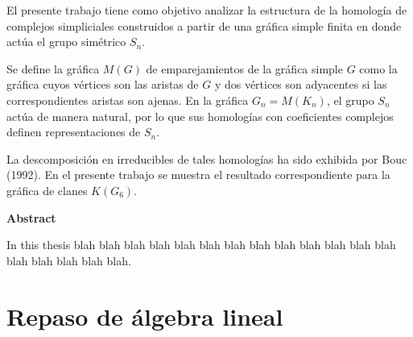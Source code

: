 \documentclass[12pt]{book}
\theoremstyle{definition}
\newcounter{in}
\newcounter{ini}
\begin{document}
El presente trabajo tiene como objetivo analizar la estructura de
la homología de complejos simpliciales construidos a partir de una
gráfica simple finita en donde actúa el grupo simétrico $S_{n}$.

Se define la gráfica $M(G)$ de emparejamientos de la gráfica simple
$G$ como la gráfica cuyos vértices son las aristas de $G$ y dos
vértices son adyacentes si las correspondientes aristas son ajenas. En
la gráfica $G_{n}=M(K_{n})$, el grupo $S_{n}$ actúa de manera natural, por
lo que sus homologías con coeficientes complejos definen
representaciones de $S_{n}$. 

La descomposición en irreducibles de tales homologías ha sido exhibida
por Bouc (1992). En el presente trabajo se muestra el resultado
correspondiente para la gráfica de clanes $K(G_{6})$.

\vspace{2cm}

\begin{flushleft}
  {\bfseries\Large Abstract}
\end{flushleft}

In this thesis blah blah blah blah blah blah blah blah blah
blah blah blah blah blah blah blah blah blah.



 \newpage \thispagestyle{empty}

\chapter{Repaso de álgebra lineal}
\end{document}
